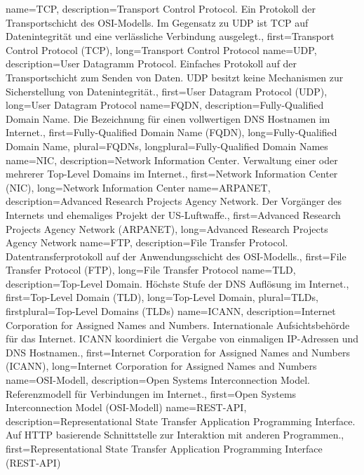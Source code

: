{%
    name={TCP},
    description={Transport Control Protocol. Ein Protokoll der
    Transportschicht des OSI-Modells. Im Gegensatz zu UDP ist TCP auf
    Datenintegrität und eine verlässliche Verbindung ausgelegt.},
    first={Transport Control Protocol (TCP)},
    long={Transport Control Protocol}
}
{%
    name={UDP},
    description={User Datagramm Protocol. Einfaches Protokoll auf der
    Transportschicht zum Senden von Daten. UDP besitzt keine Mechanismen
    zur Sicherstellung von Datenintegrität.},
    first={User Datagram Protocol (UDP)},
    long={User Datagram Protocol}
}
{%
    name={FQDN},
    description={Fully-Qualified Domain Name. Die Bezeichnung für einen
    vollwertigen DNS Hostnamen im Internet.},
    first={Fully-Qualified Domain Name (FQDN)},
    long={Fully-Qualified Domain Name},
    plural={FQDNs},
    longplural={Fully-Qualified Domain Names}
}
{%
    name={NIC},
    description={Network Information Center. Verwaltung einer oder
    mehrerer Top-Level Domains im Internet.},
    first={Network Information Center (NIC)},
    long={Network Information Center}
}
{%
    name={ARPANET},
    description={Advanced Research Projects Agency Network. Der
    Vorgänger des Internets und ehemaliges Projekt der US-Luftwaffe.},
    first={Advanced Research Projects Agency Network (ARPANET)},
    long={Advanced Research Projects Agency Network}
}
{%
    name={FTP},
    description={File Transfer Protocol. Datentransferprotokoll auf der
    Anwendungsschicht des OSI-Modells.},
    first={File Transfer Protocol (FTP)},
    long={File Transfer Protocol}
}
{%
    name={TLD},
    description={Top-Level Domain. Höchste Stufe der DNS Auflösung im
    Internet.},
    first={Top-Level Domain (TLD)},
    long={Top-Level Domain},
    plural={TLDs},
    firstplural={Top-Level Domains (TLDs)}
}
{%
    name={ICANN},
    description={Internet Corporation for Assigned Names and Numbers.
    Internationale Aufsichtsbehörde für das Internet. ICANN koordiniert
    die Vergabe von einmaligen IP-Adressen und DNS Hostnamen.},
    first={Internet Corporation for Assigned Names and Numbers (ICANN)},
    long={Internet Corporation for Assigned Names and Numbers}
}
{%
    name={OSI-Modell},
    description={Open Systems Interconnection Model. Referenzmodell für
    Verbindungen im Internet.},
    first={Open Systems Interconnection Model (OSI-Modell)}
}
{%
    name={REST-API},
    description={Representational State Transfer Application Programming
    Interface. Auf HTTP basierende Schnittstelle zur Interaktion mit
    anderen Programmen.},
    first={Representational State Transfer Application Programming Interface (REST-API)}
}
